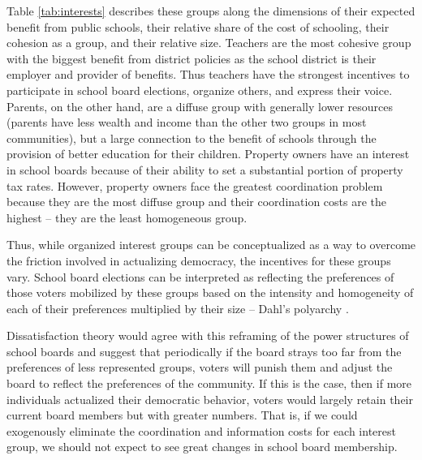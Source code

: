 Table \ref{tab:interests} describes these groups along the dimensions of their 
expected benefit from public schools, their relative share of the cost of schooling, 
their cohesion as a group, and their relative size. Teachers are the most cohesive group with the biggest benefit from district policies 
as the school district is their employer and provider of benefits. Thus teachers 
have the strongest incentives to participate in school board elections, organize 
others, and express their voice. Parents, on the other hand, are a diffuse group 
with generally lower resources (parents have less wealth and income than the other 
two groups in most communities), but a large connection to the benefit of schools 
through the provision of better education for their children. Property owners 
have an interest in school boards because of their ability to set a substantial 
portion of property tax rates. However, property owners face the greatest 
coordination problem because they are the most diffuse group and their coordination 
costs are the highest -- they are the least homogeneous group. 

Thus, while organized interest groups can be conceptualized as a way to overcome 
the friction involved in actualizing democracy, the incentives for these groups 
vary. School board elections can be interpreted as reflecting the preferences 
of those voters mobilized by these groups based on the intensity and homogeneity 
of each of their preferences multiplied by their size -- Dahl's polyarchy \citep{RefWorks:319}.

Dissatisfaction theory would agree with this reframing of the power 
structures of school boards and suggest that periodically if the board strays too 
far from the preferences of less represented groups, voters will punish them and 
adjust the board to reflect the preferences of the community. If this is the case, 
then if more individuals actualized their democratic behavior, voters would largely 
retain their current board members but with greater numbers. That is, if we could 
exogenously eliminate the coordination and information costs for each interest group, 
we should not expect to see great changes in school board membership. 

